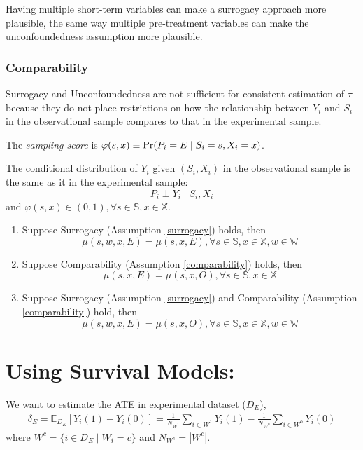 \begin{note}
    Having multiple short-term variables can make a surrogacy approach more plausible, the same way multiple pre-treatment variables can make the unconfoundedness assumption more plausible.
\end{note}


\subsubsection*{Comparability}
Surrogacy and Unconfoundedness are not sufficient for consistent estimation of $\tau$ because they do not place restrictions on how the relationship between $Y_i$ and $S_i$ in the observational sample compares to that in the experimental sample.
\begin{definition}
    The \textit{sampling score} is $\varphi(s,x)\equiv \textnormal{Pr}(P_i=E\mid S_i=s,X_i=x)$.
\end{definition}

\begin{assumption}\label{comparability}
    The conditional distribution of $Y_i$ given $(S_i, X_i)$ in the observational sample is the same as it in the experimental sample:
    $$P_i\perp Y_i\mid S_i,X_i$$
    and $\varphi(s,x)\in (0,1),\forall s\in \mathbb{S},x\in \mathbb{X}$.
\end{assumption}


\begin{proposition}
    \begin{enumerate}
        \item Suppose Surrogacy (Assumption \ref{surrogacy}) holds, then $$\mu(s,w,x,E)=\mu(s,x,E),\forall s\in \mathbb{S},x\in \mathbb{X},w\in \mathbb{W}$$
        \item Suppose Comparability (Assumption \ref{comparability}) holds, then $$\mu(s,x,E)=\mu(s,x,O),\forall s\in \mathbb{S},x\in \mathbb{X}$$
        \item Suppose Surrogacy (Assumption \ref{surrogacy}) and Comparability (Assumption \ref{comparability}) hold, then $$\mu(s,w,x,E)=\mu(s,x,O),\forall s\in \mathbb{S},x\in \mathbb{X},w\in \mathbb{W}$$
    \end{enumerate}
\end{proposition}

\section{Using Survival Models: \cite{chandar2022using}}
We want to estimate the ATE in experimental dataset ($D_E$),
\begin{equation}
    \begin{aligned}
        \delta_E=\mathbb{E}_{D_E}[Y_i(1)-Y_i(0)]=\frac{1}{N_{W^1}}\sum_{i\in W^1}Y_i(1)-\frac{1}{N_{W^0}}\sum_{i\in W^0}Y_i(0)
    \end{aligned}
    \nonumber
\end{equation}
where $W^c=\{i\in D_E\mid W_i=c\}$ and $N_{W^c}=|W^c|$.